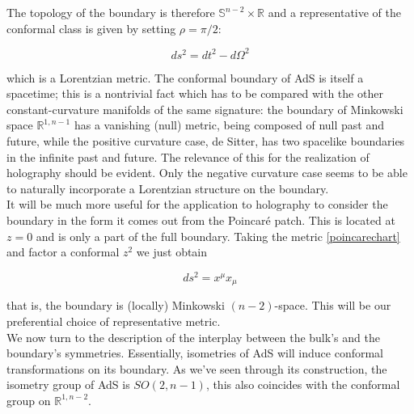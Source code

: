 The topology of the boundary is therefore $\mathbb{S}^{n-2} \times \mathbb{R}$ and a representative of the conformal class is given by setting $\rho = \pi/2$:

\begin{equation}
	ds^2 = dt^2 - d\Omega^2 
\end{equation}

which is a Lorentzian metric. The conformal boundary of AdS is itself a spacetime; this is a nontrivial fact which has to be compared with the other constant-curvature manifolds of the same signature: the boundary of Minkowski space $\mathbb{R}^{1,n-1}$ has a vanishing (null) metric, being composed of null past and future, while the positive curvature case, de Sitter, has two spacelike boundaries in the infinite past and future. The relevance of this for the realization of holography should be evident. Only the negative curvature case seems to be able to naturally incorporate a Lorentzian structure on the boundary.\\

It will be much more useful for the application to holography to consider the boundary in the form it comes out from the Poincaré patch. This is located at $z=0$ and is only a part of the full boundary. Taking the metric \ref{poincarechart} and factor a conformal $z^2$ we just obtain

\begin{equation}
	ds^2 = x^\mu x_\mu
\end{equation}

that is, the boundary is (locally) Minkowski $(n-2)$-space. This will be our preferential choice of representative metric.\\

We now turn to the description of the interplay between the bulk's and the boundary's symmetries. Essentially, isometries of AdS will induce conformal transformations on its boundary. As we've seen through its construction, the isometry group of AdS is $SO(2,n-1)$, this also coincides with the conformal group on $\mathbb{R}^{1,n-2}$.

